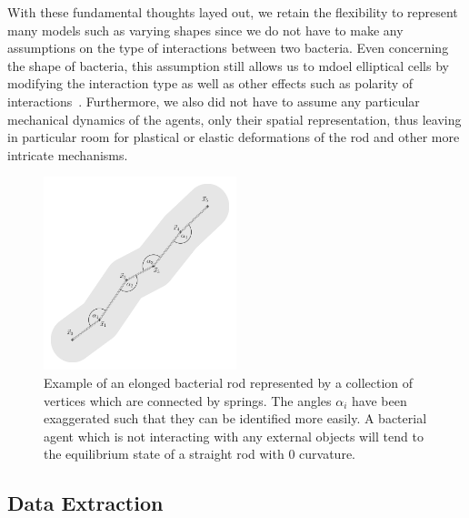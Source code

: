 \documentclass{article}
\begin{document}
With these fundamental thoughts layed out, we retain the flexibility to represent many models such
as varying shapes since we do not have to make any assumptions on the type of interactions between
two bacteria.
Even concerning the shape of bacteria, this assumption still allows us to mdoel elliptical cells by
modifying the interaction type as well as other effects such as polarity of
interactions~\cite{Duvernoy2018}.
Furthermore, we also did not have to assume any particular mechanical dynamics of the agents, only
their spatial representation, thus leaving in particular room for plastical or elastic deformations
of the rod and other more intricate mechanisms.


\begin{figure}[H]
    \centering
    \includegraphics[width=0.5\textwidth]{docs/source/_static/mechanics.png}
    \caption{
        Example of an elonged bacterial rod represented by a collection of vertices which are
        connected by springs.
        The angles $\alpha_i$ have been exaggerated such that they can be identified more easily.
        A bacterial agent which is not interacting with any external objects will tend to the
        equilibrium state of a straight rod with $0$ curvature.
    }
    \label{fig:mechanics-bacterium}
\end{figure}

\subsection{Data Extraction}
\label{section:fitting-and-comparing-masks}
\end{document}
